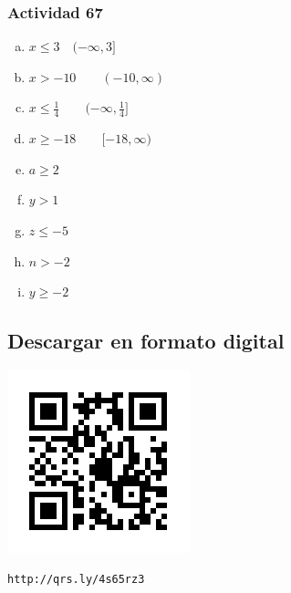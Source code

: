 \documentclass[a4paper, twocolumn]{article}
\begin{document}

\subsubsection*{Actividad 67}
\begin{enumerate}[a)]
		  \item $x \leq 3 \quad (-\infty ,3]$
		  \item $ x > -10 \qquad (-10,\infty)$
		  \item $ x \leq \frac{1}{4} \qquad (-\infty ,\frac{1}{4}]$
		  \item $ x \ge -18 \qquad [-18,\infty)$
		  \item $ a \ge 2 $
		  \item $ y > 1$
		  \item $ z \le -5$
		  \item $ n > -2$
		  \item $ y \ge -2$
\end{enumerate}


\subsection*{Descargar en formato digital}
\includegraphics{qrcode}

\begin{verbatim}http://qrs.ly/4s65rz3\end{verbatim}
\end{document}
